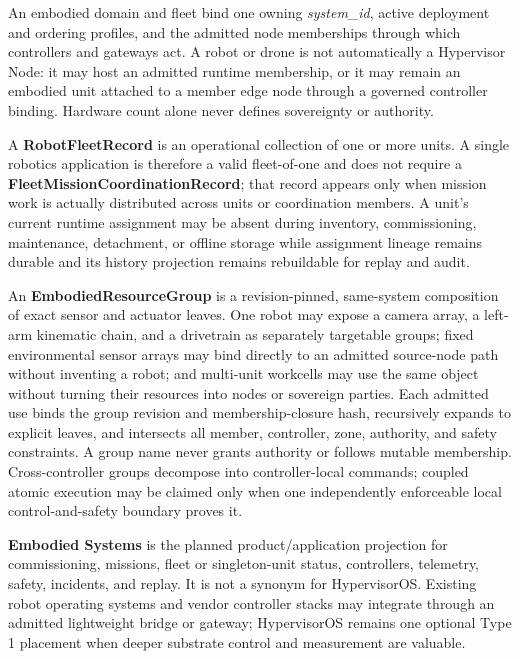 \documentclass[
  11pt,
]{article}
\begin{document}
An embodied domain and fleet bind one owning \emph{system\_id}, active
deployment and ordering profiles, and the admitted node memberships through
which controllers and gateways act. A robot or drone is not automatically a
Hypervisor Node: it may host an admitted runtime membership, or it may remain an
embodied unit attached to a member edge node through a governed controller
binding. Hardware count alone never defines sovereignty or authority.

A \textbf{RobotFleetRecord} is an operational collection of one or more units.
A single robotics application is therefore a valid fleet-of-one and does not
require a \textbf{FleetMissionCoordinationRecord}; that record appears only when
mission work is actually distributed across units or coordination members. A
unit's current runtime assignment may be absent during inventory,
commissioning, maintenance, detachment, or offline storage while assignment
lineage remains durable and its history projection remains rebuildable for
replay and audit.

An \textbf{EmbodiedResourceGroup} is a revision-pinned, same-system composition
of exact sensor and actuator leaves. One robot may expose a camera array, a
left-arm kinematic chain, and a drivetrain as separately targetable groups;
fixed environmental sensor arrays may bind directly to an admitted source-node
path without inventing a robot; and multi-unit workcells may use the same object
without turning their resources into nodes or sovereign parties. Each admitted
use binds the group revision and
membership-closure hash, recursively expands to explicit leaves, and intersects
all member, controller, zone, authority, and safety constraints. A group name
never grants authority or follows mutable membership. Cross-controller groups
decompose into controller-local commands; coupled atomic execution may be
claimed only when one independently enforceable local control-and-safety
boundary proves it.

\textbf{Embodied Systems} is the planned product/application projection for
commissioning, missions, fleet or singleton-unit status, controllers, telemetry,
safety, incidents, and replay. It is not a synonym for HypervisorOS. Existing
robot operating systems and vendor controller stacks may integrate through an
admitted lightweight bridge or gateway; HypervisorOS remains one optional Type 1
placement when deeper substrate control and measurement are valuable.
\end{document}
